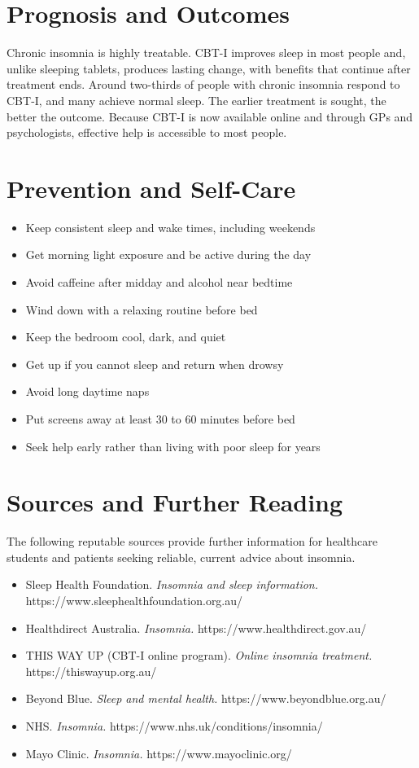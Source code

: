 \section*{Prognosis and Outcomes}
Chronic insomnia is highly treatable. CBT-I improves sleep in most people and, unlike sleeping tablets, produces lasting change, with benefits that continue after treatment ends. Around two-thirds of people with chronic insomnia respond to CBT-I, and many achieve normal sleep. The earlier treatment is sought, the better the outcome. Because CBT-I is now available online and through GPs and psychologists, effective help is accessible to most people.

\section*{Prevention and Self-Care}
\begin{itemize}
    \item Keep consistent sleep and wake times, including weekends
    \item Get morning light exposure and be active during the day
    \item Avoid caffeine after midday and alcohol near bedtime
    \item Wind down with a relaxing routine before bed
    \item Keep the bedroom cool, dark, and quiet
    \item Get up if you cannot sleep and return when drowsy
    \item Avoid long daytime naps
    \item Put screens away at least 30 to 60 minutes before bed
    \item Seek help early rather than living with poor sleep for years
\end{itemize}

\section*{Sources and Further Reading}
The following reputable sources provide further information for healthcare students and patients seeking reliable, current advice about insomnia.
\begin{itemize}
    \item Sleep Health Foundation. \textit{Insomnia and sleep information.} https://www.sleephealthfoundation.org.au/
    \item Healthdirect Australia. \textit{Insomnia.} https://www.healthdirect.gov.au/
    \item THIS WAY UP (CBT-I online program). \textit{Online insomnia treatment.} https://thiswayup.org.au/
    \item Beyond Blue. \textit{Sleep and mental health.} https://www.beyondblue.org.au/
    \item NHS. \textit{Insomnia.} https://www.nhs.uk/conditions/insomnia/
    \item Mayo Clinic. \textit{Insomnia.} https://www.mayoclinic.org/
\end{itemize}
